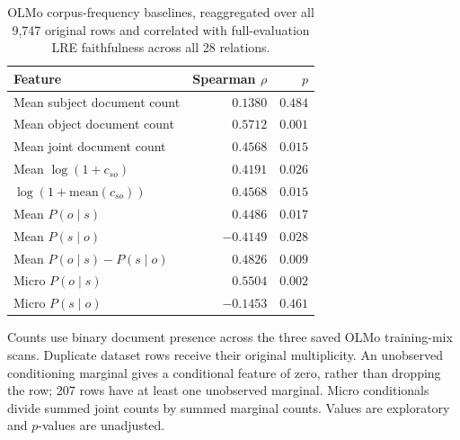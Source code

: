 \begin{table}[t]
\centering\small
\caption{OLMo corpus-frequency baselines, reaggregated over all 9,747 original rows and correlated with full-evaluation LRE faithfulness across all 28 relations.}
\label{tab:full-corpus}
\begin{tabular}{@{}lrr@{}}
\toprule
Feature & Spearman $\rho$ & $p$ \\
\midrule
Mean subject document count & $0.1380$ & $0.484$ \\
Mean object document count & $0.5712$ & $0.001$ \\
Mean joint document count & $0.4568$ & $0.015$ \\
Mean $\log(1+c_{so})$ & $0.4191$ & $0.026$ \\
$\log(1+\mathrm{mean}(c_{so}))$ & $0.4568$ & $0.015$ \\
Mean $P(o\mid s)$ & $0.4486$ & $0.017$ \\
Mean $P(s\mid o)$ & $-0.4149$ & $0.028$ \\
Mean $P(o\mid s)-P(s\mid o)$ & $0.4826$ & $0.009$ \\
Micro $P(o\mid s)$ & $0.5504$ & $0.002$ \\
Micro $P(s\mid o)$ & $-0.1453$ & $0.461$ \\
\bottomrule
\end{tabular}
\par\smallskip\begin{minipage}{\linewidth}\footnotesize Counts use binary document presence across the three saved OLMo training-mix scans. Duplicate dataset rows receive their original multiplicity. An unobserved conditioning marginal gives a conditional feature of zero, rather than dropping the row; 207 rows have at least one unobserved marginal. Micro conditionals divide summed joint counts by summed marginal counts. Values are exploratory and $p$-values are unadjusted.\end{minipage}
\end{table}

